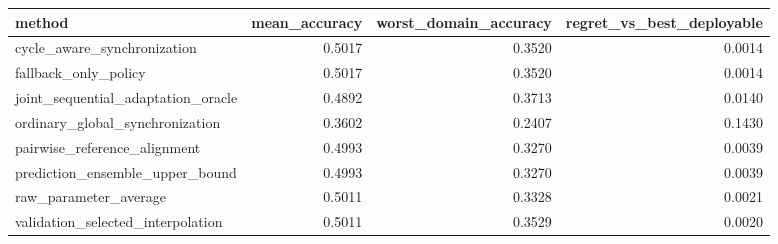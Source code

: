 \begin{tabular}{lrrr}
\toprule
method & mean_accuracy & worst_domain_accuracy & regret_vs_best_deployable \\
\midrule
cycle_aware_synchronization & 0.5017 & 0.3520 & 0.0014 \\
fallback_only_policy & 0.5017 & 0.3520 & 0.0014 \\
joint_sequential_adaptation_oracle & 0.4892 & 0.3713 & 0.0140 \\
ordinary_global_synchronization & 0.3602 & 0.2407 & 0.1430 \\
pairwise_reference_alignment & 0.4993 & 0.3270 & 0.0039 \\
prediction_ensemble_upper_bound & 0.4993 & 0.3270 & 0.0039 \\
raw_parameter_average & 0.5011 & 0.3328 & 0.0021 \\
validation_selected_interpolation & 0.5011 & 0.3529 & 0.0020 \\
\bottomrule
\end{tabular}

